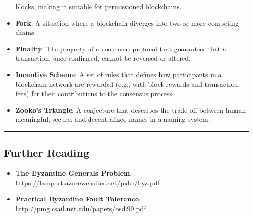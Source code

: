 \begin{itemize}
	blocks, making it suitable for permissioned blockchains.
	\item
	\textbf{Fork}: A situation where a blockchain diverges into two or
	more competing chains.
	\item
	\textbf{Finality}: The property of a consensus protocol that
	guarantees that a transaction, once confirmed, cannot be reversed or
	altered.
	\item
	\textbf{Incentive Scheme}: A set of rules that defines how
	participants in a blockchain network are rewarded (e.g., with block
	rewards and transaction fees) for their contributions to the consensus
	process.
	\item
	\textbf{Zooko's Triangle}: A conjecture that describes the trade-off
	between human-meaningful, secure, and decentralized names in a naming
	system.
\end{itemize}

\begin{center}\rule{0.5\linewidth}{0.5pt}\end{center}

\subsection{Further Reading}\label{further-reading}

\begin{itemize}
	\tightlist
	\item
	\textbf{The Byzantine Generals Problem}:\\
	\url{https://lamport.azurewebsites.net/pubs/byz.pdf}
	\item
	\textbf{Practical Byzantine Fault Tolerance}:\\
	\url{http://pmg.csail.mit.edu/papers/osdi99.pdf}
\end{itemize}

